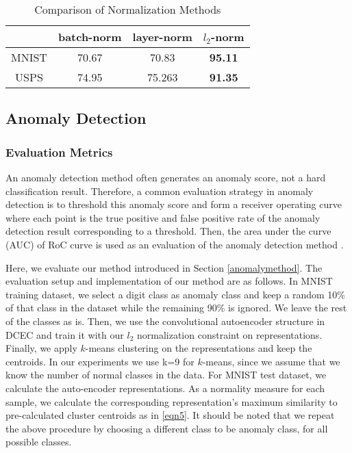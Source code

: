 \documentclass[conference]{IEEEtran}
\begin{document}
\begin{table}[!t]

\caption{Comparison of Normalization Methods}
\label{regul}
\centering
\begin{adjustbox}{width=0.4\textwidth}

\begin{tabular}{|c|c|c|c|}
\hline
 & batch-norm & layer-norm & $l_2$-norm\\ 
\hline
MNIST & 70.67  & 70.83 & \textbf{95.11}\\
\hline
USPS & 74.95 & 75.263 & \textbf{91.35}\\
\hline
\end{tabular}
\end{adjustbox}
\end{table}



\subsection{Anomaly Detection}

\subsubsection*{Evaluation Metrics}
An anomaly detection method often generates an anomaly score, not a hard classification result. 
Therefore, a common evaluation strategy in anomaly detection is to threshold this anomaly score and form a receiver operating curve where each point is the true positive and false positive rate of the anomaly detection result corresponding to a threshold. 
Then, the area under the curve (AUC) of RoC curve is used as an evaluation of the anomaly detection method \cite{ANOM}. 

Here, we evaluate our method introduced in Section \ref{anomalymethod}.
The evaluation setup and implementation of our method are as follows.
In MNIST training dataset, we select a digit class as anomaly class and keep a random 10$\%$ of that class in the dataset while the remaining 90$\%$ is ignored. 
We leave the rest of the classes as is. 
Then, we use the convolutional autoencoder structure in DCEC \cite{DCEC} and train it with our $l_2$ normalization constraint on representations. 
Finally, we apply $k$-means clustering on the representations and keep the centroids. 
In our experiments we use k=9 for $k$-means, since we assume that we know the number of normal classes in the data. 
For MNIST test dataset, we calculate the auto-encoder representations. 
As a normality measure for each sample, we calculate the corresponding representation's maximum similarity to pre-calculated cluster centroids as in \ref{eqn5}.
It should be noted that we repeat the above procedure by choosing a different class to be anomaly class, for all possible classes. 
\end{document}
